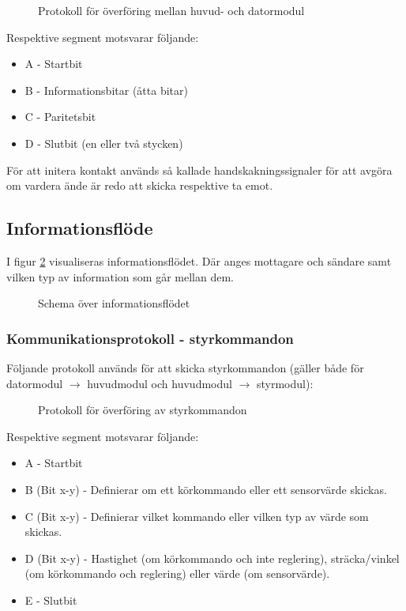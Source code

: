 \documentclass[11pt]{article}
\begin{document}
\begin{flushleft}
\begin{figure}[htbp]
\centering
\noindent\resizebox{.8\linewidth}{!}{
	}
	\caption{Protokoll för överföring mellan huvud- och datormodul \label{bluetooth}}	
\end{figure}

Respektive segment motsvarar följande:
\begin{itemize}
	\item A - Startbit
	\item B - Informationsbitar (åtta bitar)
	\item C - Paritetsbit
	\item D - Slutbit (en eller två stycken)
\end{itemize}

För att initera kontakt används så kallade handskakningssignaler för att avgöra om vardera ände är redo att skicka respektive ta emot.

\subsection{Informationsflöde}
I figur \ref{informationFlow} visualiseras informationsflödet. Där anges mottagare och sändare samt vilken typ av information som går mellan dem.

\begin{figure}[htbp]
\centering
\noindent\resizebox{.8\linewidth}{!}{
	}
	\caption{Schema över informationsflödet\label{informationFlow}}	
\end{figure}

\subsubsection{Kommunikationsprotokoll - styrkommandon}
Följande protokoll används för att skicka styrkommandon (gäller både för datormodul $\rightarrow$ huvudmodul och huvudmodul $\rightarrow$ styrmodul):

\begin{figure}[htbp]
\centering
\noindent\resizebox{.8\linewidth}{!}{
	}
	\caption{Protokoll för överföring av styrkommandon\label{styrdata}}	
\end{figure}

Respektive segment motsvarar följande: 
\begin{itemize}
	\item A - Startbit
	\item B (Bit x-y) - Definierar om ett körkommando eller ett sensorvärde skickas.
	\item C (Bit x-y) - Definierar vilket kommando eller vilken typ av värde som skickas.
	\item D (Bit x-y) - Hastighet (om körkommando och inte reglering), sträcka/vinkel (om körkommando och reglering) eller värde (om sensorvärde).
	\item E - Slutbit
\end{itemize}


\end{flushleft}
\end{document}
